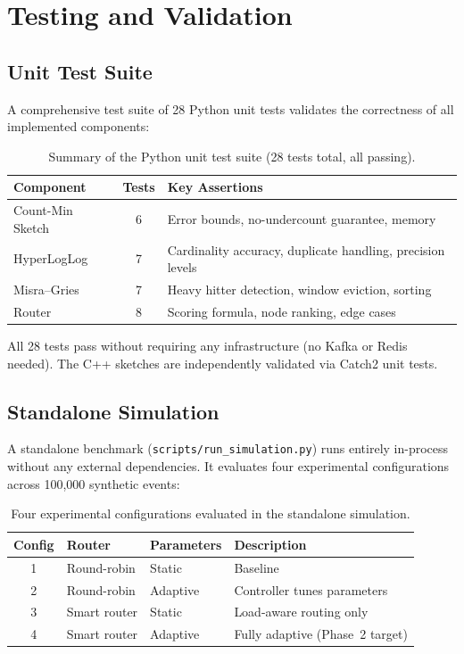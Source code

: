 \section{Testing and Validation}

\subsection{Unit Test Suite}
A comprehensive test suite of 28 Python unit tests validates the correctness of all implemented components:

\begin{table}[htbp]
\centering
\begin{tabular}{l c l}
\toprule
\textbf{Component} & \textbf{Tests} & \textbf{Key Assertions} \\
\midrule
Count-Min Sketch & 6 & Error bounds, no-undercount guarantee, memory \\
HyperLogLog      & 7 & Cardinality accuracy, duplicate handling, precision levels \\
Misra--Gries     & 7 & Heavy hitter detection, window eviction, sorting \\
Router           & 8 & Scoring formula, node ranking, edge cases \\
\bottomrule
\end{tabular}
\caption{Summary of the Python unit test suite (28 tests total, all passing).}
\label{tab:test_suite}
\end{table}

All 28 tests pass without requiring any infrastructure (no Kafka or Redis needed). The C++ sketches are independently validated via Catch2 unit tests.

\subsection{Standalone Simulation}
A standalone benchmark (\texttt{scripts/run\_simulation.py}) runs entirely in-process without any external dependencies. It evaluates four experimental configurations across 100,000 synthetic events:

\begin{table}[htbp]
\centering
\begin{tabular}{c l l l}
\toprule
\textbf{Config} & \textbf{Router} & \textbf{Parameters} & \textbf{Description} \\
\midrule
1 & Round-robin  & Static   & Baseline \\
2 & Round-robin  & Adaptive & Controller tunes parameters \\
3 & Smart router & Static   & Load-aware routing only \\
4 & Smart router & Adaptive & Fully adaptive (Phase~2 target) \\
\bottomrule
\end{tabular}
\caption{Four experimental configurations evaluated in the standalone simulation.}
\label{tab:simulation_configs}
\end{table}


